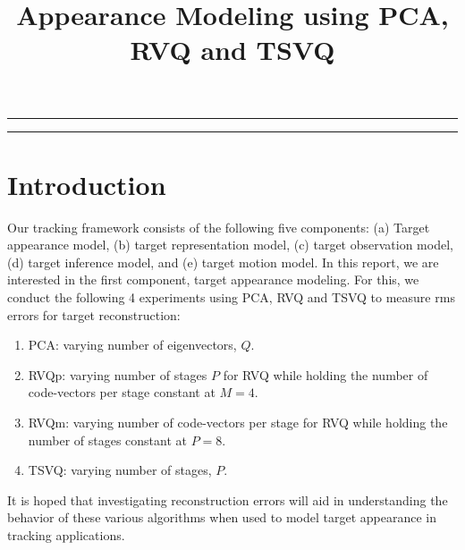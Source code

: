 
\title{Appearance Modeling using PCA, RVQ and TSVQ}
\date{}

\maketitle
\rule[0pt]{\textwidth}{1pt}
\tableofcontents
\rule[0pt]{\textwidth}{1pt}
\section{Introduction}
Our tracking framework consists of the following five components: (a) Target appearance model, (b) target representation model, (c) target observation model, (d) target inference model, and (e) target motion model.
In this report, we are interested in the first component, target appearance modeling. For this, we conduct the following 4 experiments using PCA, RVQ and TSVQ to measure rms errors for target reconstruction:
\begin{enumerate}
\item PCA: varying number of eigenvectors, $Q$.
\item RVQp: varying number of stages $P$ for RVQ while holding the number of code-vectors per stage constant at $M=4$.
\item RVQm: varying number of code-vectors per stage for RVQ while holding the number of stages constant at $P=8$.
\item TSVQ: varying number of stages, $P$.
\end{enumerate}
It is hoped that investigating reconstruction errors will aid in understanding the behavior of these various algorithms when used to model target appearance in tracking applications.
%
